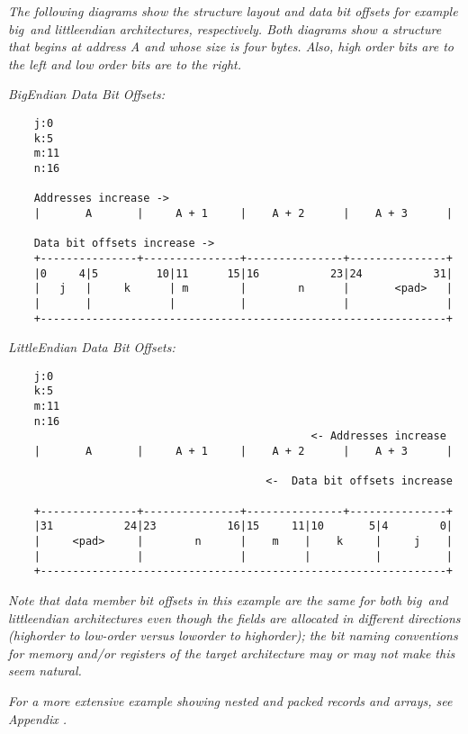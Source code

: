 \textit{The following diagrams show the structure layout
and data bit offsets for example big\dash\   and little\dash endian
architectures, respectively. Both diagrams show a structure
that begins at address A and whose size is four bytes. Also,
high order bits are to the left and low order bits are to
the right.}

\textit{Big\dash Endian Data Bit Offsets:}

\begin{verbatim}
    j:0
    k:5
    m:11
    n:16

    Addresses increase ->
    |       A       |     A + 1     |    A + 2      |    A + 3      | 

    Data bit offsets increase ->
    +---------------+---------------+---------------+---------------+
    |0     4|5         10|11      15|16           23|24           31|
    |   j   |     k      | m        |        n      |       <pad>   |
    |       |            |          |               |               | 
    +---------------------------------------------------------------+ 
\end{verbatim}

\textit{Little\dash  Endian Data Bit Offsets:}
\begin{verbatim}
    j:0
    k:5
    m:11
    n:16
                                               <- Addresses increase
    |       A       |     A + 1     |    A + 2      |    A + 3      | 

                                        <-  Data bit offsets increase 

    +---------------+---------------+---------------+---------------+
    |31           24|23           16|15     11|10       5|4        0|
    |     <pad>     |        n      |    m    |    k     |     j    |
    |               |               |         |          |          |
    +---------------------------------------------------------------+

\end{verbatim}

\textit{Note that data member bit offsets in this example are the
same for both big\dash\ and little\dash endian architectures even
though the fields are allocated in different directions
(high\dash order to low-order versus low\dash order to high\dash order);
the bit naming conventions for memory and/or registers of
the target architecture may or may not make this seem natural.}

\textit{For a more extensive example showing nested and packed records
and arrays, see 
Appendix .}

